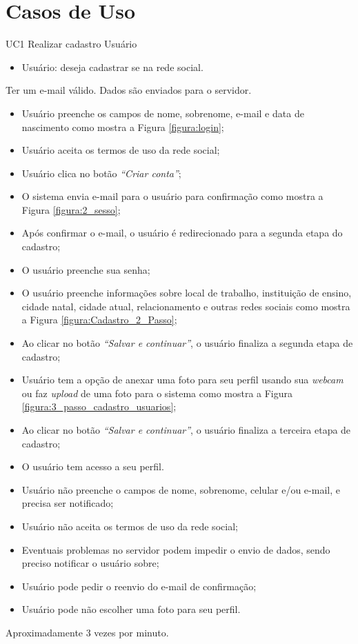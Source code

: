 \chapter{Casos de Uso}

\casoDeUso
{UC1}
{Realizar cadastro}
{Usuário}
{
\begin{itemize}
	\item Usuário: deseja cadastrar se na rede social.	
\end{itemize}

}
{Ter um e-mail válido.}
{Dados são enviados para o servidor.}
{
\begin{itemize}
	\item Usuário preenche os campos de nome, sobrenome, e-mail e data de nascimento como mostra a Figura  \ref{figura:login}; %
	\item Usuário aceita os termos de uso da rede social;		
	\item Usuário clica no botão \textit{“Criar conta”};	
	\item O sistema envia e-mail para o usuário para confirmação como mostra a Figura \ref{figura:2_sesso};
	\item Após confirmar o e-mail, o usuário é redirecionado para a segunda etapa do cadastro;		
	\item O usuário preenche sua senha;
	\item O usuário preenche informações sobre local de trabalho, instituição de ensino, cidade natal, cidade atual, relacionamento e outras redes sociais como mostra a Figura \ref{figura:Cadastro_2_Passo};
	\item Ao clicar no botão \textit{“Salvar e continuar”}, o usuário finaliza a segunda etapa de cadastro;	
	\item Usuário tem a opção de anexar uma foto para seu perfil usando sua \textit{webcam} ou faz \textit{upload} de uma foto para o sistema como mostra a Figura \ref{figura:3_passo_cadastro_usuarios}; %
	\item Ao clicar no botão \textit{“Salvar e continuar”}, o usuário finaliza a terceira etapa de cadastro;
	\item O usuário tem acesso a seu perfil.	
	
			
\end{itemize}
}
{
\begin{itemize}
	\item Usuário não preenche o campos de nome, sobrenome, celular e/ou e-mail, e precisa ser notificado;
	\item Usuário não aceita os termos de uso da rede social;
	\item Eventuais problemas no servidor podem impedir o envio de dados, sendo preciso notificar o usuário sobre;
	\item Usuário pode pedir o reenvio do e-mail de confirmação;
	\item Usuário pode não escolher uma foto para seu perfil.
	
\end{itemize}
}
{Aproximadamente 3 vezes por minuto.}
{

}

